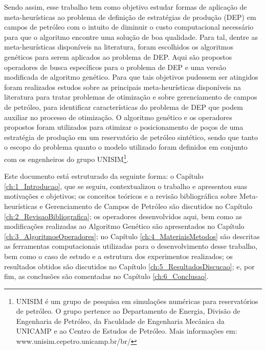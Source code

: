 Sendo assim, esse trabalho tem como objetivo estudar formas de aplicação de meta-heurísticas ao problema de definição de estratégias de produção (DEP) em campos de petróleo com o intuito de diminuir o custo computacional necessário para que o algoritmo encontre uma solução de boa qualidade. Para tal, dentre as meta-heurísticas disponíveis na literatura, foram escolhidos os algoritmos genéticos para serem aplicados ao problema de DEP. Aqui são propostos operadores de busca específicos para o problema de DEP e uma versão modificada de algoritmo genético. Para que tais objetivos pudessem ser atingidos foram realizados estudos sobre as principais meta-heurísticas disponíveis na literatura para tratar problemas de otimização e sobre gerenciamento de campos de petróleo, para identificar características do problema de DEP que podem auxiliar no processo de otimização. O algoritmo genético e os operadores propostos foram utilizados para otimizar o posicionamento de poços de uma estratégia de produção em um reservatório de petróleo sintético, sendo que tanto o escopo do problema quanto o modelo utilizado foram definidos em conjunto com os engenheiros do grupo UNISIM\footnote{UNISIM é um grupo de pesquisa em simulações numéricas para reservatórios de petróleo. O grupo pertence ao Departamento de Energia, Divisão de Engenharia de Petróleo, da Faculdade de Engenharia Mecânica da UNICAMP e ao Centro de Estudos de Petróleo. Mais informações em: www.unisim.cepetro.unicamp.br/br/}.

Este documento está estruturado da seguinte forma: o Capítulo \ref{ch:1_Introducao}, que se seguiu, contextualizou o trabalho e apresentou suas motivações e objetivos; os conceitos teóricos e a revisão bibliográfica sobre Meta-heurísticas e Gerenciamento de Campos de Petróleo são discutidos no Capítulo \ref{ch:2_RevisaoBibliografica}; os operadores desenvolvidos aqui, bem como as modificações realizadas ao Algoritmo Genético são apresentados no Capítulo \ref{ch:3_AlgoritmosOperadores}; no Capítulo \ref{ch:4_MateriaisMetodos} são descritas as ferramentas computacionais utilizadas para o desenvolvimento desse trabalho, bem como o caso de estudo e a estrutura dos experimentos realizados; os resultados obtidos são discutidos no Capítulo \ref{ch:5_ResultadosDiscucao}; e, por fim, as conclusões são comentadas no Capítulo \ref{ch:6_Conclusao}.